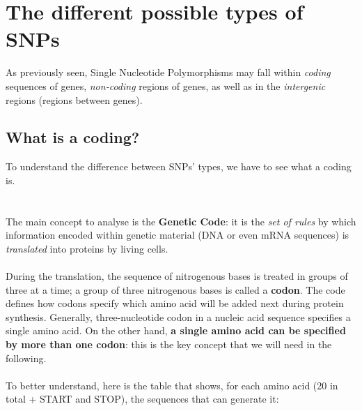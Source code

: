 \section{The different possible types of SNPs}
As previously seen, Single Nucleotide Polymorphisms may fall within \emph{coding} sequences of genes, \emph{non-coding} regions of genes, as well as in the \emph{intergenic} regions (regions between genes).

\subsection{What is a coding?}
To understand the difference between SNPs’ types, we have to see what a coding is.
\\
\\
\\The main concept to analyse is the \textbf{Genetic Code}: it is the \emph{set of rules} by which information encoded within genetic material (DNA or even mRNA sequences) is \emph{translated} into proteins by living cells.
\\
\\
During the translation, the sequence of nitrogenous bases is treated in groups of three at a time; a group of three nitrogenous bases is called a \textbf{codon}. The code defines how codons specify which amino acid will be added next during protein synthesis. Generally, three-nucleotide codon in a nucleic acid sequence specifies a single amino acid. On the other hand, \textbf{a single amino acid can be specified by more than one codon}: this is the key concept that we will need in the following.
\\
\\To better understand, here is the table that shows, for each amino acid (20 in total + START and STOP), the sequences that can generate it:

